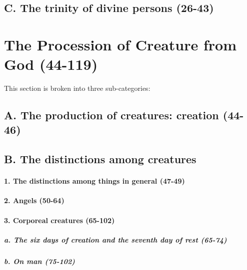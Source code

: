 \documentclass{ucetd}
\begin{document}














\subsection{C. The trinity of divine persons (26-43)}




\clearpage

\section{The Procession of Creature from God (44-119)}
This section is broken into three sub-categories:
\subsection{A. The production of creatures: creation (44-46)}
\subsection{B. The distinctions among creatures}
\paragraph{1.   The distinctions among things in general (47-49)}
\paragraph{2.   Angels (50-64)}
\paragraph{3.   Corporeal creatures (65-102)}
\subparagraph{a. The six days of creation and the seventh day of rest (65-74)}
\subparagraph{b. On man (75-102)}
\end{document}
